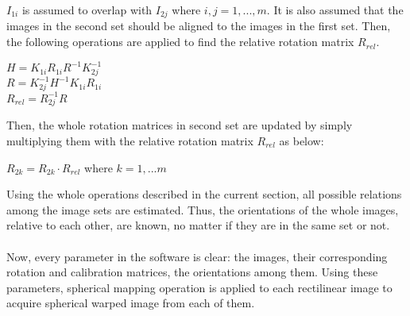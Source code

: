 \documentclass{article}
\begin{document}
$I_{1i}$ is assumed to overlap with $I_{2j}$ where $i,j = 1,...,m$. It is also assumed that the images in the second set should be aligned to the images in the first set. Then, the following operations are applied to find the relative rotation matrix $R_{rel}$. 
\begin{center}
    $H = K_{1i}R_{1i}R^{-1}K^{-1}_{2j}$ \\   
    $R = K^{-1}_{2j}H^{-1}K_{1i}R_{1i}$ \\
    $R_{rel} = R^{-1}_{2j}R$\\
\end{center}
Then, the whole rotation matrices in second set are updated by simply multiplying them with the relative rotation matrix $R_{rel}$ as below:
\begin{center}
    $R_{2k} = R_{2k} \cdot R_{rel}$ where $ k = 1,...m$\\
\end{center}
Using the whole operations described in the current section, all possible relations among the image sets are estimated. Thus, the orientations of the whole images, relative to each other, are known, no matter if they are in the same set or not.\\~\\
Now, every parameter in the software is clear: the images, their corresponding rotation and calibration matrices, the orientations among them. Using these parameters, spherical mapping operation is applied to each rectilinear image to acquire spherical warped image from each of them.\\~\\
\end{document}
